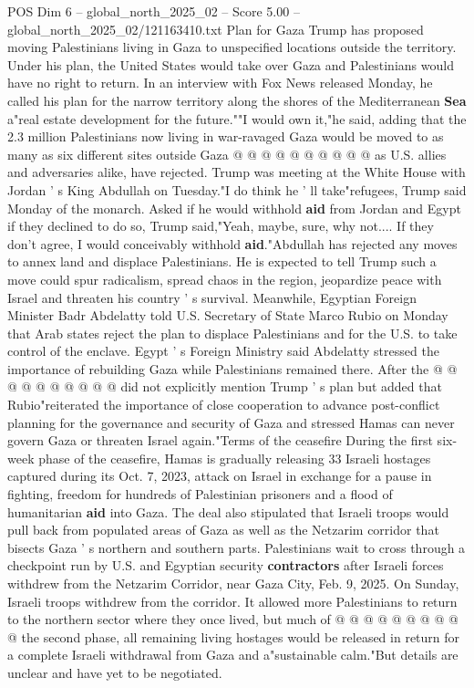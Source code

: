 \begin{textsample}{POS Dim 6 – global\_north\_2025\_02 – Score 5.00 – global\_north\_2025\_02/121163410.txt}
Plan for Gaza Trump has proposed moving Palestinians living in Gaza to unspecified locations outside the territory.
Under his plan, the United States would take over Gaza and Palestinians would have no right to return.
In an interview with Fox News released Monday, he called his plan for the narrow territory along the shores of the Mediterranean \textbf{Sea} a"real estate development for the future.""I would own it,"he said, adding that the 2.3 million Palestinians now living in war-ravaged Gaza would be moved to as many as six different sites outside Gaza @ @ @ @ @ @ @ @ @ @ as U.S. allies and adversaries alike, have rejected.
Trump was meeting at the White House with Jordan ' s King Abdullah on Tuesday."I do think he ' ll take"refugees, Trump said Monday of the monarch.
Asked if he would withhold \textbf{aid} from Jordan and Egypt if they declined to do so, Trump said,"Yeah, maybe, sure, why not....
If they don't agree, I would conceivably withhold \textbf{aid}."Abdullah has rejected any moves to annex land and displace Palestinians.
He is expected to tell Trump such a move could spur radicalism, spread chaos in the region, jeopardize peace with Israel and threaten his country ' s survival.
Meanwhile, Egyptian Foreign Minister Badr Abdelatty told U.S.
Secretary of State Marco Rubio on Monday that Arab states reject the plan to displace Palestinians and for the U.S. to take control of the enclave.
Egypt ' s Foreign Ministry said Abdelatty stressed the importance of rebuilding Gaza while Palestinians remained there.
After the @ @ @ @ @ @ @ @ @ @ did not explicitly mention Trump ' s plan but added that Rubio"reiterated the importance of close cooperation to advance post-conflict planning for the governance and security of Gaza and stressed Hamas can never govern Gaza or threaten Israel again."Terms of the ceasefire During the first six-week phase of the ceasefire, Hamas is gradually releasing 33 Israeli hostages captured during its Oct. 7, 2023, attack on Israel in exchange for a pause in fighting, freedom for hundreds of Palestinian prisoners and a flood of humanitarian \textbf{aid} into Gaza.
The deal also stipulated that Israeli troops would pull back from populated areas of Gaza as well as the Netzarim corridor that bisects Gaza ' s northern and southern parts.
Palestinians wait to cross through a checkpoint run by U.S. and Egyptian security \textbf{contractors} after Israeli forces withdrew from the Netzarim Corridor, near Gaza City, Feb. 9, 2025.
On Sunday, Israeli troops withdrew from the corridor.
It allowed more Palestinians to return to the northern sector where they once lived, but much of @ @ @ @ @ @ @ @ @ @ the second phase, all remaining living hostages would be released in return for a complete Israeli withdrawal from Gaza and a"sustainable calm."But details are unclear and have yet to be negotiated.

\end{textsample}
